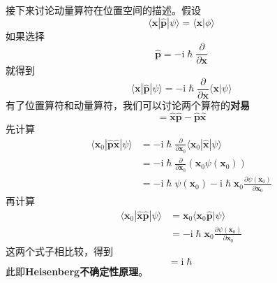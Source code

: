         接下来讨论动量算符在位置空间的描述。假设
        \begin{equation}
            \langle \bm{x} |\hat{\bm{p}} | \psi \rangle
            = \langle \bm{x} | \phi \rangle
        \end{equation}
        如果选择
        \begin{equation}
            \hat{\bm{p}} = -\mathrm{i}\hslash \frac {\partial }{\partial \bm{x}}
        \end{equation}
        就得到
        \begin{equation}
            \langle \bm{x} |\hat{\bm{p}} | \psi \rangle = -\mathrm{i}\hslash \frac {\partial }{\partial \bm{x}}\langle \bm{x} | \psi \rangle
        \end{equation}
        有了位置算符和动量算符，我们可以讨论两个算符的\textbf{对易}
        \begin{equation}
            [\hat{\bm{x}},\hat{\bm{p}}] = \hat{\bm{x}}\hat{\bm{p}} - \hat{\bm{p}}\hat{\bm{x}}
        \end{equation}
        先计算
        \begin{equation}\begin{aligned}
            \langle \bm{x}_0 |\hat{\bm{p}}\hat{\bm{x}} | \psi \rangle &= -\mathrm{i}\hslash \frac {\partial}{\partial \bm{x}_0} \langle \bm{x}_0 |\hat{\bm{x}} | \psi \rangle\\
            &= -\mathrm{i}\hslash \frac {\partial}{\partial \bm{x}_0} (\bm{x}_0\psi(\bm{x}_0))\\
            &= -\mathrm{i}\hslash \psi(\bm{x}_0) - \mathrm{i}\hslash \bm{x}_0 \frac {\partial \psi(\bm{x}_0)}{\partial \bm{x}_0}
        \end{aligned}\end{equation}
        再计算
        \begin{equation}\begin{aligned}
            \langle \bm{x}_0 |\hat{\bm{x}} \hat{\bm{p}} | \psi \rangle &= \bm{x}_0 \langle \bm{x}_0 \hat{\bm{p}} | \psi \rangle\\
            &= -\mathrm{i}\hslash \bm{x}_0 \frac {\partial \psi(\bm{x}_0)}{\partial \bm{x}_0}
        \end{aligned}\end{equation}
        这两个式子相比较，得到
        \begin{equation}
            [\hat{\bm{x}},\hat{\bm{p}}] = \mathrm{i}\hslash
        \end{equation}
        此即\textbf{Heisenberg不确定性原理}。

